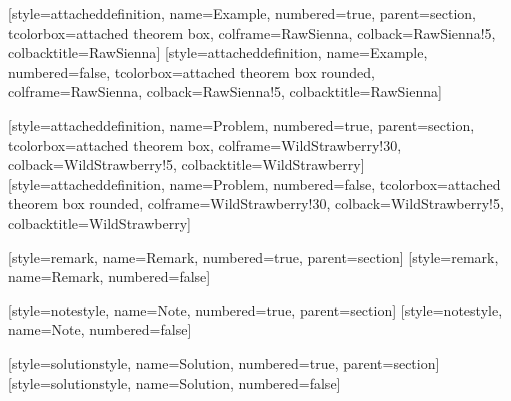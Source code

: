 [style=attacheddefinition, name=Example, numbered=true, parent=section,
    tcolorbox={attached theorem box, colframe=RawSienna, colback=RawSienna!5, colbacktitle=RawSienna}]
[style=attacheddefinition, name=Example, numbered=false,
    tcolorbox={attached theorem box rounded, colframe=RawSienna, colback=RawSienna!5, colbacktitle=RawSienna}]

[style=attacheddefinition, name=Problem, numbered=true, parent=section,
    tcolorbox={attached theorem box, colframe=WildStrawberry!30, colback=WildStrawberry!5, colbacktitle=WildStrawberry}]
[style=attacheddefinition, name=Problem, numbered=false,
    tcolorbox={attached theorem box rounded, colframe=WildStrawberry!30, colback=WildStrawberry!5, colbacktitle=WildStrawberry}]

[style=remark, name=Remark, numbered=true, parent=section]
[style=remark, name=Remark, numbered=false]

\newcommand{\notehandmark}{\llap{\raisebox{0.05ex}{\large\ding{45}}\hspace{0.6em}}}

[style=notestyle, name={\notehandmark Note}, numbered=true, parent=section]
[style=notestyle, name={\notehandmark Note}, numbered=false]


[style=solutionstyle, name=Solution, numbered=true, parent=section]
[style=solutionstyle, name=Solution, numbered=false]

